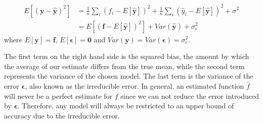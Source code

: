 \begin{align*}
E\left[\left(\boldsymbol{y}-\boldsymbol{\hat{y}}\right)^2\right] &= \frac{1}{n}\sum_i\left(f_i- E\left[\boldsymbol{\hat{y}}\right]\right)^2+\frac{1}{n}\sum_i\left(\hat{y}_i- E\left[\boldsymbol{\hat{y}}\right]\right)^2+\sigma^2 \\
&= E\left[\left(\boldsymbol{f}-E\left[\boldsymbol{\hat{y}}\right]\right)^2\right] + Var\left(\boldsymbol{\hat{y}}\right) + \sigma_{\epsilon}^2
\end{align*}
where $E[\boldsymbol{y}] = \boldsymbol{f}$, $E\left[\boldsymbol{\epsilon}\right] = \boldsymbol{0}$ and $Var\left(\boldsymbol{y}\right) = Var \left(\boldsymbol{\epsilon}\right) = \sigma_{\epsilon}^2$.

\begin{comment}
and since the variance of $\boldsymbol{y}$ and $\boldsymbol{\epsilon}$ are both equal to $\sigma^2$, we can use the relations $E[\boldsymbol{y}] = \boldsymbol{f}$, $ E[\boldsymbol{\epsilon}] = 0 $ and $Var(\boldsymbol{y}) = Var(\boldsymbol{\epsilon}) = \sigma_{\epsilon}^2$. The mean value of $\boldsymbol{\epsilon}$ is by definition equal to zero. In addition, the function $\boldsymbol{f}$ is not a stochastic variable, and the same argument can also be used for $\boldsymbol{\hat{y}}$. This allows us to insert the expression $\boldsymbol{y}$ into the cost function
\begin{align*}
E[(\boldsymbol{y-\hat{y}})^2] &= E[(\boldsymbol{f + \epsilon - \hat{y}})^2].
\end{align*}
By using the infamous trick of both adding and subtracting simultaneously, we arrive at
\begin{align*}
E\left[(\boldsymbol{y}-\boldsymbol{\hat{y}})^2\right] &= E[(\boldsymbol{f + \epsilon - \hat{y}} + E[\boldsymbol{y}] - E[\boldsymbol{y}])^2 ].
\end{align*}

And simply by using the relations mentioned above concerning the expectation value for $\boldsymbol{y}$ and the variances for both $\boldsymbol{y}$ and $\epsilon$, the cost function can be rewritten to:

\begin{align*}
E\left[(\boldsymbol{y}-\boldsymbol{\hat{y}})^2\right] &=  E[(\boldsymbol{f}-E[\boldsymbol{\hat{y}}])^2] + Var(\boldsymbol{\hat{y}}) + \sigma_{\epsilon}^2 \\
 &= \frac{1}{n}\sum_i(f_i- E\left[\boldsymbol{\hat{y}}\right])^2+\frac{1}{n}\sum_i(\hat{y}_i- E\left[\boldsymbol{\hat{y}}\right])^2+\sigma^2_{\epsilon}.
\end{align*}

\end{comment}
The first term on the right hand side is the squared bias, the amount by which the average of our estimate differs from the true mean, while the second term represents the variance of the chosen model. The last term is the variance of the error $\boldsymbol{\epsilon}$, also known as the irreducible error. In general, an estimated function $\hat{f}$ will never be a perfect estimate for $f$ since we can not reduce the error introduced by $\boldsymbol{\epsilon}$. Therefore, any model will always be restricted to an upper bound of accuracy due to the irreducible error.

